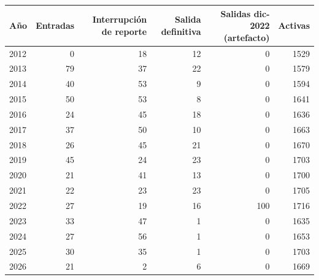 \begin{tabular}{lrrrrr}
\toprule
Año & Entradas & Interrupción de reporte & Salida definitiva & Salidas dic-2022 (artefacto) & Activas \\
\midrule
2012 & 0 & 18 & 12 & 0 & 1529 \\
2013 & 79 & 37 & 22 & 0 & 1579 \\
2014 & 40 & 53 & 9 & 0 & 1594 \\
2015 & 50 & 53 & 8 & 0 & 1641 \\
2016 & 24 & 45 & 18 & 0 & 1636 \\
2017 & 37 & 50 & 10 & 0 & 1663 \\
2018 & 26 & 45 & 21 & 0 & 1670 \\
2019 & 45 & 24 & 23 & 0 & 1703 \\
2020 & 21 & 41 & 13 & 0 & 1700 \\
2021 & 22 & 23 & 23 & 0 & 1705 \\
2022 & 27 & 19 & 16 & 100 & 1716 \\
2023 & 33 & 47 & 1 & 0 & 1635 \\
2024 & 27 & 56 & 1 & 0 & 1653 \\
2025 & 30 & 35 & 1 & 0 & 1703 \\
2026 & 21 & 2 & 6 & 0 & 1669 \\
\bottomrule
\end{tabular}
